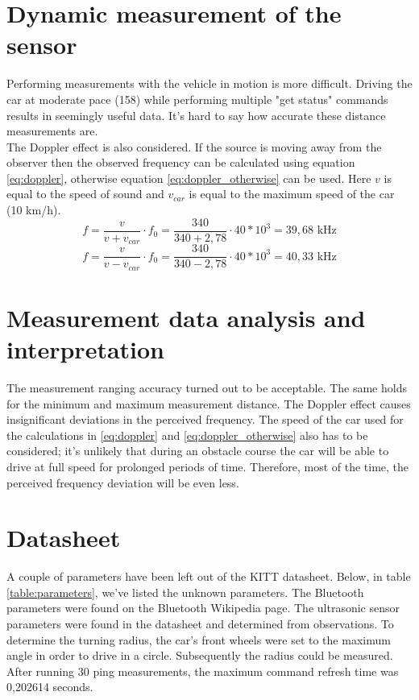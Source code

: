 \documentclass[final]{scrreprt} %
\begin{document}
\section{Dynamic measurement of the sensor}

Performing measurements with the vehicle in motion is more difficult. Driving the car at moderate pace (158) while performing multiple "get status" commands results in seemingly useful data. It's hard to say how accurate these distance measurements are.\\ The Doppler effect is also considered. If the source is moving away from the observer then the observed frequency can be calculated using equation \ref{eq:doppler}, otherwise equation \ref{eq:doppler_otherwise} can be used. Here $v$ is equal to the speed of sound and $v_{car}$ is equal to the maximum speed of the car (10 km/h).
\begin{equation} 
\label{eq:doppler}
f = \dfrac{v}{v+v_{car}} \cdot f_{0} = \dfrac{340}{340 + 2,78} \cdot {40*10^3} = 39,68 \text{ kHz}
\end{equation}
\begin{equation} 
\label{eq:doppler_otherwise}
f = \dfrac{v}{v-v_{car}} \cdot f_{0} = \dfrac{340}{340 - 2,78} \cdot {40*10^3} = 40,33 \text{ kHz}
\end{equation}


\section{Measurement data analysis and interpretation}

The measurement ranging accuracy turned out to be acceptable. The same holds for the minimum and maximum measurement distance. The Doppler effect causes insignificant deviations in the perceived frequency. The speed of the car used for the calculations in \ref{eq:doppler} and \ref{eq:doppler_otherwise} also has to be considered; it's unlikely that during an obstacle course the car will be able to drive at full speed for prolonged periods of time. Therefore, most of the time, the perceived frequency deviation will be even less.

\section{Datasheet}

A couple of parameters have been left out of the KITT datasheet. Below, in table \ref{table:parameters}, we've listed the unknown parameters. The Bluetooth parameters were found on the Bluetooth Wikipedia page. The ultrasonic sensor parameters were found in the datasheet and determined from observations. To determine the turning radius, the car's front wheels were set to the maximum angle in order to drive in a circle. Subsequently the radius could be measured. After running 30 ping measurements, the maximum command refresh time was 0,202614 seconds.
\end{document}
